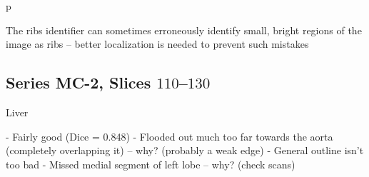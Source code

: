 \begin{stusubfig}{p}
	\hspace{4mm}%
\caption{The ribs identifier can sometimes erroneously identify small, bright regions of the image as ribs -- better localization is needed to prevent such mistakes}
\label{fig:validation-SD-2-70-90-ribs-extraneous}
\end{stusubfig}

\afterpage{\clearpage}
\newpage

\subsection{Series MC-2, Slices $110$--$130$}

\iffalse

Liver

- Fairly good (Dice = 0.848)
- Flooded out much too far towards the aorta (completely overlapping it) -- why? (probably a weak edge)
- General outline isn't too bad
- Missed medial segment of left lobe -- why? (check scans)

